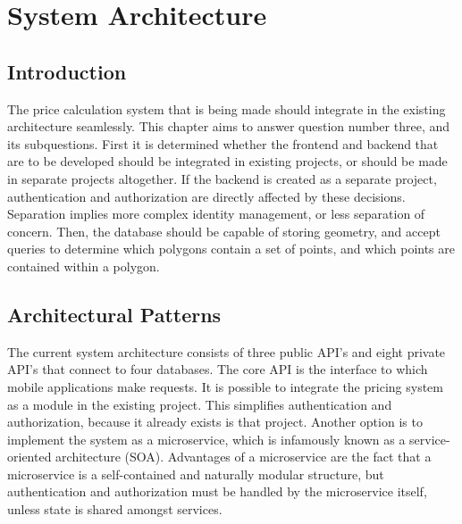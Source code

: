 \chapter{System Architecture}

\ifpdf
	\graphicspath{{Chapter3/Figs/Raster/}{Chapter3/Figs/PDF/}{Chapter3/Figs/}}
\else
	\graphicspath{{Chapter3/Figs/Vector/}{Chapter3/Figs/}}
\fi

\section{Introduction}

The price calculation system that is being made should integrate in the existing architecture seamlessly. This chapter aims to answer question number three, and its subquestions. First it is determined whether the frontend and backend that are to be developed should be integrated in existing projects, or should be made in separate projects altogether. If the backend is created as a separate project, authentication and authorization are directly affected by these decisions. Separation implies more complex identity management, or less separation of concern. Then, the database should be capable of storing geometry, and accept queries to determine which polygons contain a set of points, and which points are contained within a polygon.

\section{Architectural Patterns}

The current system architecture consists of three public API's and eight private API's that connect to four databases.  The core API is the interface to which mobile applications make requests. It is possible to integrate the pricing system as a module in the existing project. This simplifies authentication and authorization, because it already exists is that project. Another option is to implement the system as a microservice, which is infamously known as a service-oriented architecture (SOA). Advantages of a microservice are the fact that a microservice is a self-contained and naturally modular structure, but authentication and authorization must be handled by the microservice itself, unless state is shared amongst services.

